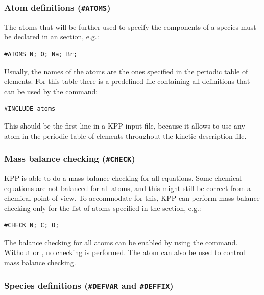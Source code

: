 \documentclass[twoside]{article}
\begin{document}
\subsubsection{Atom definitions ({\tt\#ATOMS})}
\label{sec:section-atoms}

The atoms that will be further used to specify the components of a
species must be declared in an  section, e.g.:
%
\begin{verbatim}
#ATOMS N; O; Na; Br;
\end{verbatim}
%
Usually, the names of the atoms are the ones specified in the periodic
table of elements. For this table there is a predefined file containing
all definitions that can be used by the command:
%
\begin{verbatim}
#INCLUDE atoms
\end{verbatim}
%
This should be the first line in a KPP input file, because it allows to
use any atom in the periodic table of elements throughout the kinetic
description file.

\subsubsection{Mass balance checking ({\tt\#CHECK})}
\label{sec:section-check}

KPP is able to do a mass balance checking for all equations. Some
chemical equations are not balanced for all atoms, and this might still
be correct from a chemical point of view. To accommodate for this, KPP
can perform mass balance checking only for the list of atoms specified
in the  section, e.g.:
%
\begin{verbatim}
#CHECK N; C; O;
\end{verbatim}
%
The balance checking for all atoms can be enabled by using the
 command. Without  or , no
checking is performed. The  atom can also be used to
control mass balance checking.

\subsubsection{Species definitions ({\tt\#DEFVAR} and {\tt\#DEFFIX})}
\label{sec:section-defvar-deffix}
\end{document}
